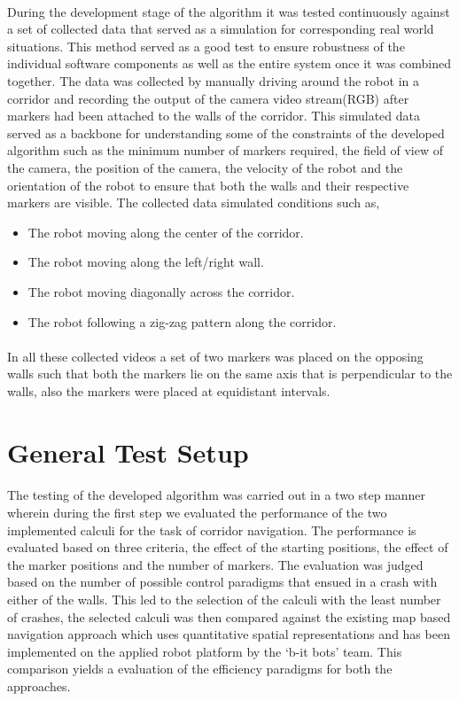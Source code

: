 \paragraph{}During the development stage of the algorithm it was tested continuously against a set of collected data that served as a simulation for corresponding real world situations. This method served as a good test to ensure robustness of the individual software components as well as the entire system once it was combined together. The data was collected by manually driving around the robot in a corridor and recording the output of the camera video stream(RGB) after markers had been attached to the walls of the corridor. This simulated data served as a backbone for understanding some of the constraints of the developed algorithm such as the minimum number of markers required, the field of view of the camera, the position of the camera, the velocity of the robot and the orientation of the robot to ensure that both the walls and their respective markers are visible. The collected data simulated conditions such as, 
\begin{itemize}
	\item The robot moving along the center of the corridor.
	\item The robot moving along the left/right wall.
	\item The robot moving diagonally across the corridor.
	\item The robot following a zig-zag pattern along the corridor.
\end{itemize} 
\paragraph{} In all these collected videos a set of two markers was placed on the opposing walls such that both the markers lie on the same axis that is perpendicular to the walls, also the markers were placed at equidistant intervals.
\section{General Test Setup}
\paragraph{} The testing of the developed algorithm was carried out in a two step manner wherein during the first step we evaluated the performance of the two implemented calculi for the task of corridor navigation. The performance is evaluated based on three criteria, the effect of the starting positions, the effect of the marker positions and the number of markers. The evaluation was judged based on the number of possible control paradigms that ensued in a crash with either of the walls. This led to the selection of the calculi with the least number of crashes, the selected calculi was then compared against the existing map based navigation approach which uses quantitative spatial representations and has been implemented on the applied robot platform by the `b-it bots' team. This comparison yields a evaluation of the efficiency paradigms for both the approaches.

